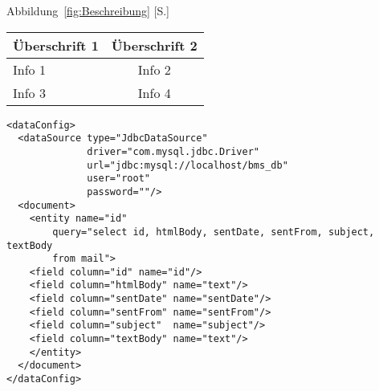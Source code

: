 

Abbildung~\ref{fig:Beschreibung} [S.\pageref{fig:Beschreibung}]

\begin{center}
  \begin{tabular}{ | l | c | }
    \hline
    Überschrift 1 & Überschrift 2 \\ \hline \hline
    Info 1 & Info 2 \\ \hline
    Info 3 & Info 4 \\
    \hline
  \end{tabular}
\end{center}


\lstset{language=xml}
\begin{lstlisting}[frame=htrbl, caption={Die Datei {\tt data-config.xml} dient als Beispiel für XML Quellcode}, label={lst:dataconfigxml}]
<dataConfig>
  <dataSource type="JdbcDataSource" 
              driver="com.mysql.jdbc.Driver"
              url="jdbc:mysql://localhost/bms_db"
              user="root" 
              password=""/>
  <document>
    <entity name="id"
        query="select id, htmlBody, sentDate, sentFrom, subject, textBody
        from mail">
    <field column="id" name="id"/>
    <field column="htmlBody" name="text"/>
    <field column="sentDate" name="sentDate"/>
    <field column="sentFrom" name="sentFrom"/>
    <field column="subject"  name="subject"/>
    <field column="textBody" name="text"/>
    </entity>
  </document>
</dataConfig>
\end{lstlisting}

